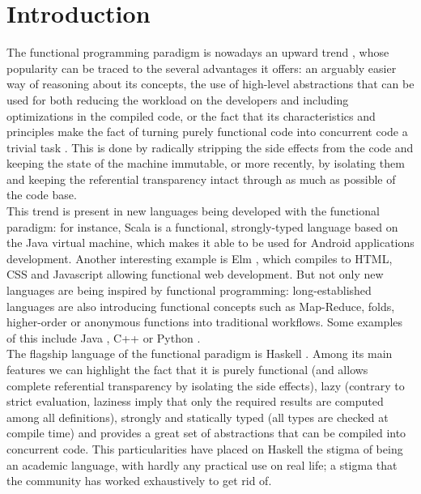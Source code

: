 \section{Introduction}

The functional programming paradigm is nowadays an upward trend
\cite{ford-2013-ibm}, whose popularity can be traced to the several advantages
it offers: an arguably easier way of reasoning about its concepts, the use of
high-level abstractions that can be used for both reducing the workload on the
developers and including optimizations in the compiled code, or the fact that
its characteristics and principles make the fact of turning purely functional
code into concurrent code a trivial task \cite{hammond-2012-parallel}. This is
done by radically stripping the side effects from the code and keeping the
state of the machine immutable, or more recently, by isolating them and keeping
the referential transparency intact through as much as possible of the code base.\\

This trend is present in new languages being developed with the functional
paradigm: for instance, Scala \cite{scala} is a functional, strongly-typed
language based on the Java virtual machine, which makes it able to be used for
Android applications development. Another interesting example is Elm
\cite{elm}, which compiles to HTML, CSS and Javascript allowing functional web
development. But not only new languages are being inspired by functional
programming: long-established languages are also introducing functional
concepts such as Map-Reduce, folds, higher-order or anonymous functions into
traditional workflows. Some examples of this include Java \cite{java8},
C++ \cite{cpp-lambdas, cpp-high-level} or Python \cite{python-mrs}.\\

The flagship language of the functional paradigm is Haskell \cite{haskell-98}.
Among its main features we can highlight the fact that it is purely functional
(and allows complete referential transparency by isolating the side effects),
lazy (contrary to strict evaluation, laziness imply that only the required
results are computed among all definitions), strongly and statically typed (all
types are checked at compile time) and provides a great set of abstractions
that can be compiled into concurrent code. This particularities have placed on
Haskell the stigma of being an academic language, with hardly any practical use
on real life; a stigma that the community has worked exhaustively to get rid
of.\\

